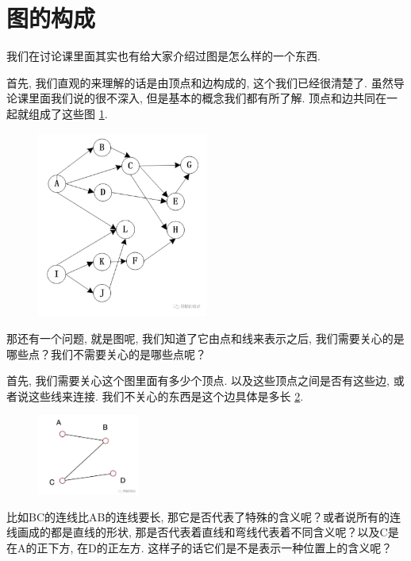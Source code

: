 \section{图的构成}

我们在讨论课里面其实也有给大家介绍过图是怎么样的一个东西. 

首先, 我们直观的来理解的话是由顶点和边构成的, 这个我们已经很清楚了. 虽然导论课里面我们说的很不深入, 但是基本的概念我们都有所了解. 顶点和边共同在一起就组成了这些图 \ref{fig:img24_6}. 

\begin{figure}[ht]
  \centering
  \includegraphics[width=0.5\textwidth]{asset/20231227144901.png}
  \caption{}
  \label{fig:img24_6}
\end{figure}

那还有一个问题, 就是图呢, 我们知道了它由点和线来表示之后, 我们需要关心的是哪些点？我们不需要关心的是哪些点呢？

首先, 我们需要关心这个图里面有多少个顶点. 以及这些顶点之间是否有这些边, 或者说这些线来连接. 我们不关心的东西是这个边具体是多长 \ref{fig:img24_7}. 

\begin{figure}[ht]
  \centering
  \includegraphics[width=0.3\textwidth]{asset/20231227144917.png}
  \caption{}
  \label{fig:img24_7}
\end{figure}

比如BC的连线比AB的连线要长, 那它是否代表了特殊的含义呢？或者说所有的连线画成的都是直线的形状, 那是否代表着直线和弯线代表着不同含义呢？以及C是在A的正下方, 在D的正左方. 这样子的话它们是不是表示一种位置上的含义呢？

